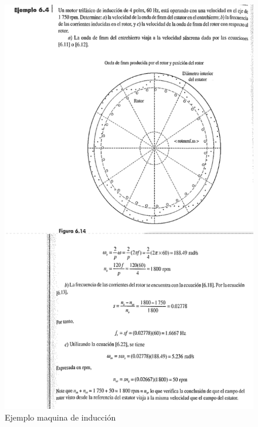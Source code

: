 \documentclass[]{article}
\begin{document}
\begin{figure}[h!]
	\centering
	\includegraphics[width=1\textwidth]{maquinaInduccionEjemplo}
	\caption{Ejemplo maquina de inducción}
	\label{fig:maqInduccion}
\end{figure}





%
%
\end{document}
